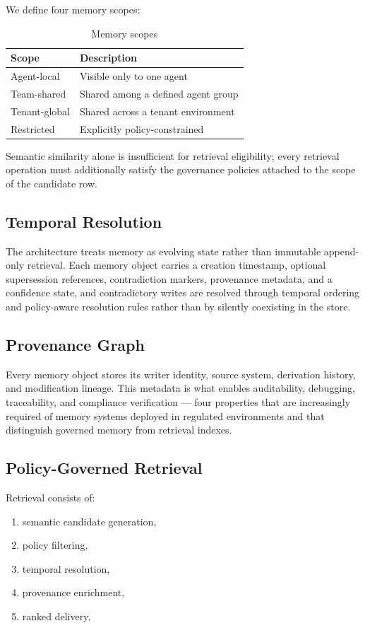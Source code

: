 \documentclass[10pt,twocolumn,letterpaper]{article}
\begin{document}
We define four memory scopes:

\begin{table}[H]
\centering
\caption{Memory scopes}
\begin{tabular}{ll}
\toprule
Scope & Description \\
\midrule
Agent-local & Visible only to one agent \\
Team-shared & Shared among a defined agent group \\
Tenant-global & Shared across a tenant environment \\
Restricted & Explicitly policy-constrained \\
\bottomrule
\end{tabular}
\end{table}

Semantic similarity alone is insufficient for retrieval eligibility; every retrieval operation must additionally satisfy the governance policies attached to the scope of the candidate row.

\subsection{Temporal Resolution}

The architecture treats memory as evolving state rather than immutable append-only retrieval. Each memory object carries a creation timestamp, optional supersession references, contradiction markers, provenance metadata, and a confidence state, and contradictory writes are resolved through temporal ordering and policy-aware resolution rules rather than by silently coexisting in the store.

\subsection{Provenance Graph}

Every memory object stores its writer identity, source system, derivation history, and modification lineage. This metadata is what enables auditability, debugging, traceability, and compliance verification --- four properties that are increasingly required of memory systems deployed in regulated environments and that distinguish governed memory from retrieval indexes.

\subsection{Policy-Governed Retrieval}

Retrieval consists of:
\begin{enumerate}
    \item semantic candidate generation,
    \item policy filtering,
    \item temporal resolution,
    \item provenance enrichment,
    \item ranked delivery.
\end{enumerate}
\end{document}
